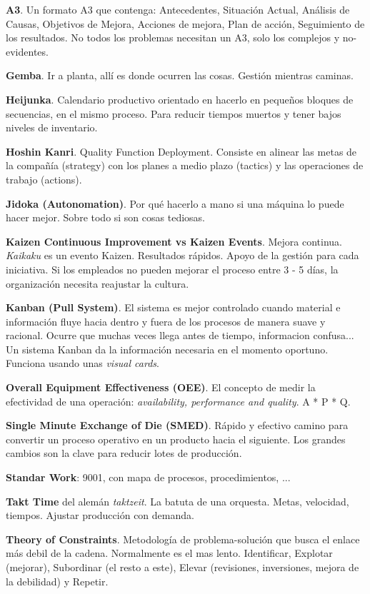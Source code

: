 \documentclass[oneside]{book}
\begin{document}
\textbf{A3}. Un formato A3 que contenga: Antecedentes, Situación Actual, Análisis de Causas, Objetivos de Mejora, Acciones de mejora, Plan de acción, Seguimiento de los resultados. No todos los problemas necesitan un A3, solo los complejos y no-evidentes.

\textbf{Gemba}. Ir a planta, allí es donde ocurren las cosas. Gestión mientras caminas.

\textbf{Heijunka}. Calendario productivo orientado en hacerlo en pequeños bloques de secuencias, en el mismo proceso. Para reducir tiempos muertos y tener bajos niveles de inventario.

\textbf{Hoshin Kanri}. Quality Function Deployment. Consiste en alinear las metas de la compañía (strategy) con los planes a medio plazo (tactics) y las operaciones de trabajo (actions). 

\textbf{Jidoka (Autonomation)}. Por qué hacerlo a mano si una máquina lo puede hacer mejor. Sobre todo si son cosas tediosas. 

\textbf{Kaizen Continuous Improvement vs Kaizen Events}. Mejora continua. \textit{Kaikaku} es un evento Kaizen. Resultados rápidos. Apoyo de la gestión para cada iniciativa. Si los empleados no pueden mejorar el proceso entre 3 - 5 días, la organización necesita reajustar la cultura.

\textbf{Kanban (Pull System)}. El sistema es mejor controlado cuando material e información fluye hacia dentro y fuera de los procesos de manera suave y racional. Ocurre que muchas veces llega antes de tiempo, informacion confusa... Un sistema Kanban da la información necesaria en el momento oportuno. Funciona usando unas \textit{visual cards}.

\textbf{Overall Equipment Effectiveness (OEE)}. El concepto de medir la efectividad de una operación: \textit{availability, performance and quality}. A * P * Q. 

\textbf{Single Minute Exchange of Die (SMED)}. Rápido y efectivo camino para convertir un proceso operativo en un producto hacia el siguiente. Los grandes cambios son la clave para reducir lotes de producción.

\textbf{Standar Work}: 9001, con mapa de procesos, procedimientos, ...

\textbf{Takt Time} del alemán \textit{taktzeit}. La batuta de una orquesta. Metas, velocidad, tiempos. Ajustar producción con demanda.

\textbf{Theory of Constraints}. Metodología de problema-solución que busca el enlace más debil de la cadena. Normalmente es el mas lento. Identificar, Explotar (mejorar), Subordinar (el resto a este), Elevar (revisiones, inversiones, mejora de la debilidad) y Repetir.
\end{document}
